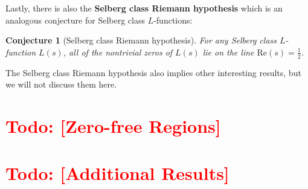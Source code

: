 \documentclass[12pt]{book}
\newtheorem{conjecture}{Conjecture}[section]
\theoremstyle{definition}\newframedtheorem{method}{Method}
\newcommand{\<}{\langle}
\renewcommand{\>}{\rangle}
\renewcommand{\Re}{\mathrm{Re}}
\newcommand{\todo}[1]{\textcolor{red}{\sf Todo: [#1]}}
\begin{document}
    Lastly, there is also the \textbf{Selberg class Riemann hypothesis} which is an analogous conjecture for Selberg class $L$-functions:

    \begin{conjecture}[Selberg class Riemann hypothesis]
      For any Selberg class $L$-function $L(s)$, all of the nontrivial zeros of $L(s)$ lie on the line $\Re(s) = \frac{1}{2}$.
    \end{conjecture}

    The Selberg class Riemann hypothesis also implies other interesting results, but we will not discuss them here.
  \section{\todo{Zero-free Regions}}
  \section{\todo{Additional Results}}
\end{document}
